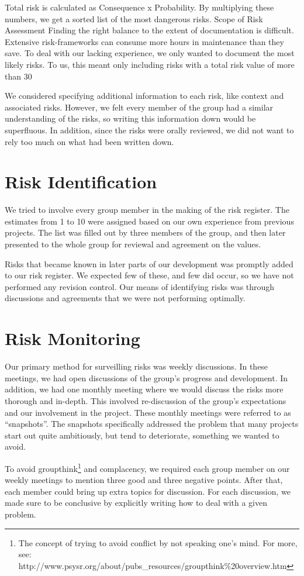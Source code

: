 Total risk is calculated as Consequence x Probability. By multiplying
these numbers, we get a sorted list of the most dangerous risks. 
Scope of Risk Assessment
Finding the right balance to the extent of documentation is difficult.
Extensive risk-frameworks can consume more hours in maintenance than
they save. To deal with our lacking experience, we only wanted to
document the most likely risks. To us, this meant only including risks
with a total risk value of more than 30

We considered specifying additional information to each risk, like
context and associated risks. However, we felt every member of the
group had a similar understanding of the risks, so writing this
information down would be superfluous. In addition, since the risks
were orally reviewed, we did not want to rely too much on what had been
written down.

\section{Risk Identification}
We tried to involve every group member in the making of the risk
register. The estimates from 1 to 10 were assigned based on our own
experience from previous projects. The list was filled out by three
members of the group, and then later presented to the whole group for
reviewal and agreement on the values. 

Risks that became known in later parts of our development was promptly
added to our risk register. We expected few of these, and few did
occur, so we have not performed any revision control. Our means of identifying
risks was through discussions and agreements that we were not
performing optimally.

\section{Risk Monitoring}
Our primary method for surveilling risks was weekly discussions. In
these meetings, we had open discussions of the group's
progress and development. In addition, we had one monthly meeting where
we would discuss the risks more thorough and in-depth. This involved
re-discussion of the group's expectations and our
involvement in the project. These monthly meetings were referred to as
``snapshots''. The snapshots
specifically addressed the problem that many projects start out quite
ambitiously, but tend to deteriorate, something we wanted to avoid.

To avoid groupthink\footnote{The concept of trying to avoid conflict
by not speaking one's mind. For more, see:
http://www.psysr.org/about/pubs\_resources/groupthink\%20overview.htm}
and complacency, we required each group member on our weekly meetings
to mention three good and three negative points. After that, each
member could bring up extra topics for discussion. For each discussion,
we made sure to be conclusive by explicitly writing how to deal with a
given problem. 

